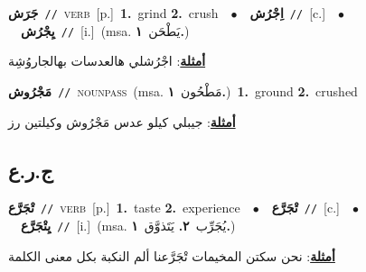 \documentclass[10pt,a4paper,twoside]{article} %
\begin{document}
\begin{multicols}{2}
{\setlength\topsep{0pt}\textbf{\foreignlanguage{arabic}{جَرَش}}\ {\color{gray}\texttt{//}\color{black}}\ \textsc{verb}\ [p.]\ \textbf{1.}~grind  \textbf{2.}~crush\ \ $\bullet$\ \ \setlength\topsep{0pt}\textbf{\foreignlanguage{arabic}{اِجْرُش}}\ {\color{gray}\texttt{//}\color{black}}\ [c.]\ \ $\bullet$\ \ \setlength\topsep{0pt}\textbf{\foreignlanguage{arabic}{يِجْرُش}}\ {\color{gray}\texttt{//}\color{black}}\ [i.]\ \color{gray}(msa. \foreignlanguage{arabic}{يَطْحَن}~\foreignlanguage{arabic}{\textbf{١.}})\color{black}\  \begin{flushright}\color{gray}\foreignlanguage{arabic}{\textbf{\underline{\foreignlanguage{arabic}{أمثلة}}}: اجْرُشلي هالعدسات بهالجاروُشِة}\end{flushright}\color{black}} \vspace{2mm}

{\setlength\topsep{0pt}\textbf{\foreignlanguage{arabic}{مَجْرُوش}}\ {\color{gray}\texttt{//}\color{black}}\ \textsc{noun\textunderscore pass}\ \color{gray}(msa. \foreignlanguage{arabic}{مَطْحُون}~\foreignlanguage{arabic}{\textbf{١.}})\color{black}\ \textbf{1.}~ground  \textbf{2.}~crushed\  \begin{flushright}\color{gray}\foreignlanguage{arabic}{\textbf{\underline{\foreignlanguage{arabic}{أمثلة}}}: جيبلي كيلو عدس مَجْرُوش وكيلتين رز}\end{flushright}\color{black}} \vspace{2mm}

\vspace{-3mm}
\subsection*{\color{blue}\foreignlanguage{arabic}{ج.ر.ع}\color{blue}{}} 

{\setlength\topsep{0pt}\textbf{\foreignlanguage{arabic}{تْجَرَّع}}\ {\color{gray}\texttt{//}\color{black}}\ \textsc{verb}\ [p.]\ \textbf{1.}~taste  \textbf{2.}~experience\ \ $\bullet$\ \ \setlength\topsep{0pt}\textbf{\foreignlanguage{arabic}{تْجَرَّع}}\ {\color{gray}\texttt{//}\color{black}}\ [c.]\ \ $\bullet$\ \ \setlength\topsep{0pt}\textbf{\foreignlanguage{arabic}{يِتْجَرَّع}}\ {\color{gray}\texttt{//}\color{black}}\ [i.]\ \color{gray}(msa. \foreignlanguage{arabic}{يُجَرِّب}~\foreignlanguage{arabic}{\textbf{٢.}}  \foreignlanguage{arabic}{يَتَذوَّق}~\foreignlanguage{arabic}{\textbf{١.}})\color{black}\  \begin{flushright}\color{gray}\foreignlanguage{arabic}{\textbf{\underline{\foreignlanguage{arabic}{أمثلة}}}: نحن سكتن المخيمات تْجَرَّعنا ألم النكبة بكل معنى الكلمة}\end{flushright}\color{black}} \vspace{2mm}


\end{multicols}
\end{document}
